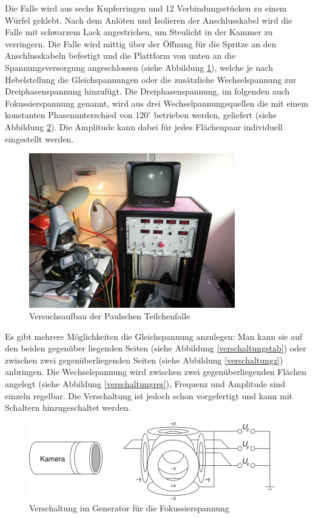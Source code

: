 \documentclass[a4paper,12pt]{article}
\begin{document}
Die Falle wird aus sechs Kupferringen und 12 Verbindungsstücken zu einem Würfel geklebt.
Nach dem Anlöten und Isolieren der Anschlusskabel wird die Falle mit schwarzem Lack angestrichen, um Steulicht in der Kammer zu verringern.
Die Falle wird mittig über der Öffnung für die Spritze an den Anschlusskabeln befestigt und die Plattform von unten an die Spannungsversorgung angeschlossen (siehe Abbildung \ref{fallenbild}),
welche je nach Hebelstellung die Gleichspannungen oder die zusätzliche Wechselspannung zur Dreiphasenspannung hinzufügt.
Die Dreiphasenspannung, im folgenden auch Fokussierspannung genannt, wird aus drei Wechselpannungsquellen die mit einem konstanten Phasenunterschied von $120^\circ$ betrieben werden, geliefert (siehe Abbildung \ref{verschaltung3phase}).
Die Amplitude kann dabei für jedes Flächenpaar individuell eingestellt werden.

\begin{figure}[htb]
		\centering
		\includegraphics[width=0.8\textwidth]{aufbau.jpg}
		\caption{Versuchsaufbau der Paulschen Teilchenfalle}
		\label{fallenbild}
\end{figure}

Es gibt mehrere Möglichkeiten die Gleichspannung anzulegen:
Man kann sie auf den beiden gegenüber liegenden Seiten (siehe Abbildung \ref{verschaltungstab}) oder zwischen zwei
gegenüberliegenden Seiten (siehe Abbildung \ref{verschaltungz}) anbringen.
Die Wechselspannung wird zwischen zwei gegenüberliegenden Flächen angelegt (siehe Abbildung \ref{verschaltungres}), Frequenz und Amplitude sind einzeln regelbar.
Die Verschaltung ist jedoch schon vorgefertigt und kann mit Schaltern hinzugeschaltet werden.

\begin{figure}[htb]
		\centering
		\includegraphics{Schaltbild_3Phasen.png}
		\caption{Verschaltung im Generator für die Fokussierspannung}
		\label{verschaltung3phase}
\end{figure}
\end{document}
